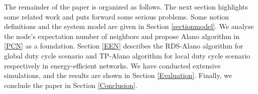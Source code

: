 
The remainder of the paper is organized as follows.
The next section highlights some related work and 
puts forward some serious problems. 
Some notion definitions and the system model are given in Section
\ref{sectionmodel}. 
We analyse the node's expectation number of neighbors and 
propose Alano algorithm in \ref{PCN} as a foundation.
Section \ref{EEN} describes the RDS-Alano algorithm for global
duty cycle scenario and TP-Alano algorithm for local duty cycle scenario
respectively in energy-efficient networks.
We have conducted extensive simulations, and the results are shown in Section
\ref{Evaluation}. Finally, we conclude the paper in Section
\ref{Conclusion}.


